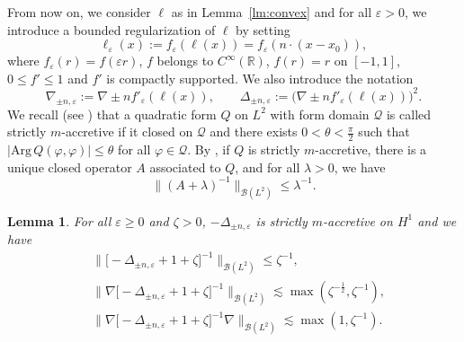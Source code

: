 \documentclass[12pt]{article}
\theoremstyle{plain}
\newtheorem{lemma}[theo]{Lemma}
\begin{document}
	From now on, we consider $\ell$ as in Lemma~\ref{lm:convex} and for all $\varepsilon>0$, we introduce a bounded regularization of $\ell$ by setting
	    \begin{equation*}
      \ell_\varepsilon(x):=f_\varepsilon(\ell(x))=f_\varepsilon(n\cdot(x-x_0)),
	    \end{equation*}
	    where $f_\varepsilon(r)=f(\varepsilon r)$, $f$ belongs to $C^\infty(\mathbb{R})$, $f(r)=r$ on $[-1,1]$, $0\le f'\le1$ and $f'$ is compactly supported. 
	    We also introduce the notation
	    \begin{equation*}
	        \nabla_{\pm n,\varepsilon}:=\nabla\pm n f'_\varepsilon(\ell(x)), \qquad \Delta_{\pm n,\varepsilon}:=\big(\nabla\pm n f'_\varepsilon(\ell(x))\big)^2.
	    \end{equation*}
We recall (see \cite{ReedSimon1}) that a quadratic form $Q$ on $L^2$ with form domain $\mathcal{Q}$ is called strictly $m$-accretive if it closed on $\mathcal{Q}$ and there exists $0<\theta<\frac\pi2$ such that $|\mathrm{Arg}\, Q(\varphi,\varphi)|\le\theta$ for all $\varphi\in\mathcal{Q}$. By \cite[Theorem VIII.16]{ReedSimon1}, if $Q$ is strictly $m$-accretive, there is a unique closed operator $A$ associated to $Q$, and for all $\lambda>0$, we have
\begin{equation*}
    \|(A+\lambda)^{-1}\|_{\mathcal{B}(L^2)}\le\lambda^{-1}.
\end{equation*}

	\begin{lemma}
	    For all $\varepsilon\ge0$ and $\zeta>0$, $-\Delta_{\pm n,\varepsilon}$ is strictly $m$-accretive on $H^1$ and we have
	\begin{align}
    & \big\|\big[-\Delta_{\pm n,\varepsilon}+1+\zeta \big]^{-1}\big\|_{\mathcal{B}(L^2)}\le \zeta^{-1},\label{eq:bound-res1}\\
    & \big\|\nabla\big[-\Delta_{\pm n,\varepsilon}+1+\zeta \big]^{-1}\big\|_{\mathcal{B}(L^2)}\lesssim \max(\zeta^{-\frac12},\zeta^{-1}),\label{eq:bound-res2}\\
    & \big\|\nabla\big[-\Delta_{\pm n,\varepsilon}+1+\zeta\big]^{-1}\nabla\big\|_{\mathcal{B}(L^2)}\lesssim \max(1,\zeta^{-1}).\label{eq:bound-res3}
\end{align}
	\end{lemma}
	
\end{document}
